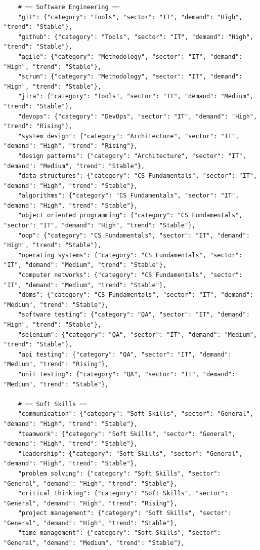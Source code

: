 \documentclass[12pt,a4paper]{report}
\begin{document}
\begin{verbatim}
    # ── Software Engineering ──
    "git": {"category": "Tools", "sector": "IT", "demand": "High", "trend": "Stable"},
    "github": {"category": "Tools", "sector": "IT", "demand": "High", "trend": "Stable"},
    "agile": {"category": "Methodology", "sector": "IT", "demand": "High", "trend": "Stable"},
    "scrum": {"category": "Methodology", "sector": "IT", "demand": "High", "trend": "Stable"},
    "jira": {"category": "Tools", "sector": "IT", "demand": "Medium", "trend": "Stable"},
    "devops": {"category": "DevOps", "sector": "IT", "demand": "High", "trend": "Rising"},
    "system design": {"category": "Architecture", "sector": "IT", "demand": "High", "trend": "Rising"},
    "design patterns": {"category": "Architecture", "sector": "IT", "demand": "Medium", "trend": "Stable"},
    "data structures": {"category": "CS Fundamentals", "sector": "IT", "demand": "High", "trend": "Stable"},
    "algorithms": {"category": "CS Fundamentals", "sector": "IT", "demand": "High", "trend": "Stable"},
    "object oriented programming": {"category": "CS Fundamentals", "sector": "IT", "demand": "High", "trend": "Stable"},
    "oop": {"category": "CS Fundamentals", "sector": "IT", "demand": "High", "trend": "Stable"},
    "operating systems": {"category": "CS Fundamentals", "sector": "IT", "demand": "Medium", "trend": "Stable"},
    "computer networks": {"category": "CS Fundamentals", "sector": "IT", "demand": "Medium", "trend": "Stable"},
    "dbms": {"category": "CS Fundamentals", "sector": "IT", "demand": "Medium", "trend": "Stable"},
    "software testing": {"category": "QA", "sector": "IT", "demand": "High", "trend": "Stable"},
    "selenium": {"category": "QA", "sector": "IT", "demand": "Medium", "trend": "Stable"},
    "api testing": {"category": "QA", "sector": "IT", "demand": "Medium", "trend": "Rising"},
    "unit testing": {"category": "QA", "sector": "IT", "demand": "Medium", "trend": "Stable"},

    # ── Soft Skills ──
    "communication": {"category": "Soft Skills", "sector": "General", "demand": "High", "trend": "Stable"},
    "teamwork": {"category": "Soft Skills", "sector": "General", "demand": "High", "trend": "Stable"},
    "leadership": {"category": "Soft Skills", "sector": "General", "demand": "High", "trend": "Stable"},
    "problem solving": {"category": "Soft Skills", "sector": "General", "demand": "High", "trend": "Stable"},
    "critical thinking": {"category": "Soft Skills", "sector": "General", "demand": "High", "trend": "Rising"},
    "project management": {"category": "Soft Skills", "sector": "General", "demand": "High", "trend": "Stable"},
    "time management": {"category": "Soft Skills", "sector": "General", "demand": "Medium", "trend": "Stable"},


\end{verbatim}
\end{document}
